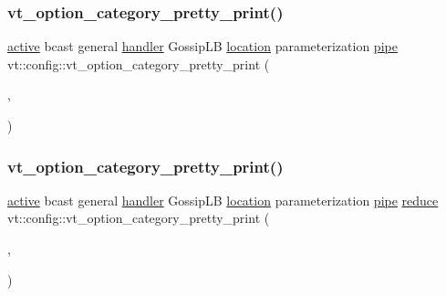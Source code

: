 \subsubsection{\texorpdfstring{vt\+\_\+option\+\_\+category\+\_\+pretty\+\_\+print()}{vt\_option\_category\_pretty\_print()}\hspace{0.1cm}{\footnotesize\ttfamily [9/16]}}
{\footnotesize\ttfamily \hyperlink{namespacevt_1_1config_a6bd1d6215bda0d8ca02811798399f689a82f77c67af0c363709010c6df4dbd920}{active} bcast general \hyperlink{namespacevt_1_1config_a6bd1d6215bda0d8ca02811798399f689a82a0081a94d5c5dfd18b0b3f7eca64b7}{handler} Gossip\+LB \hyperlink{namespacevt_1_1config_a6bd1d6215bda0d8ca02811798399f689aa8d8501591ca3859c828489054b17640}{location} parameterization \hyperlink{namespacevt_1_1config_a6bd1d6215bda0d8ca02811798399f689ad2f6c4149417910966357969e4740fbd}{pipe} vt\+::config\+::vt\+\_\+option\+\_\+category\+\_\+pretty\+\_\+print (\begin{DoxyParamCaption}\item[{\hyperlink{namespacevt_1_1config_a6bd1d6215bda0d8ca02811798399f689a50ba0efa092380eb92cee1d921d6e40f}{pool}}]{,  }\item[{\char`\"{}pool\char`\"{}}]{ }\end{DoxyParamCaption})}

\mbox{\label{namespacevt_1_1config_a7bebe2587614a1334c0c15678470e584}} 
\subsubsection{\texorpdfstring{vt\+\_\+option\+\_\+category\+\_\+pretty\+\_\+print()}{vt\_option\_category\_pretty\_print()}\hspace{0.1cm}{\footnotesize\ttfamily [10/16]}}
{\footnotesize\ttfamily \hyperlink{namespacevt_1_1config_a6bd1d6215bda0d8ca02811798399f689a82f77c67af0c363709010c6df4dbd920}{active} bcast general \hyperlink{namespacevt_1_1config_a6bd1d6215bda0d8ca02811798399f689a82a0081a94d5c5dfd18b0b3f7eca64b7}{handler} Gossip\+LB \hyperlink{namespacevt_1_1config_a6bd1d6215bda0d8ca02811798399f689aa8d8501591ca3859c828489054b17640}{location} parameterization \hyperlink{namespacevt_1_1config_a6bd1d6215bda0d8ca02811798399f689ad2f6c4149417910966357969e4740fbd}{pipe} \hyperlink{namespacevt_1_1config_a6bd1d6215bda0d8ca02811798399f689af558c370706b5e7bd8ba5224657ca9b4}{reduce} vt\+::config\+::vt\+\_\+option\+\_\+category\+\_\+pretty\+\_\+print (\begin{DoxyParamCaption}\item[{\hyperlink{namespacevt_1_1config_a6bd1d6215bda0d8ca02811798399f689a0b97b5f0db04922b0839112e029ba677}{rdma}}]{,  }\item[{\char`\"{}R\+D\+MA\char`\"{}}]{ }\end{DoxyParamCaption})}

